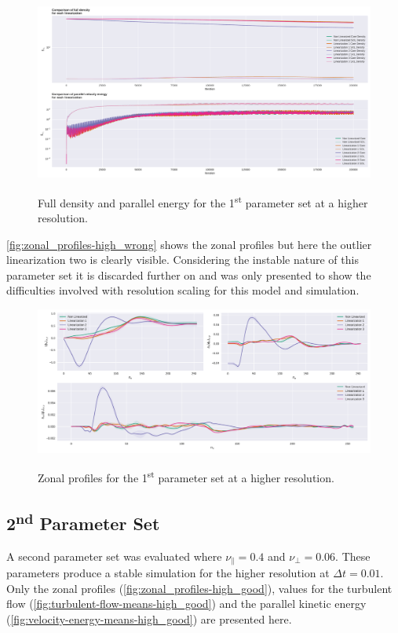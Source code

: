 \documentclass[master.tex]{subfiles}
\begin{document}
\begin{figure}[!hbtp]
    \includegraphics[width=\linewidth]{pdfs/0-11_0-001375/density_vs_velocity.pdf}
    \label{fig:density-velocity-high-wrong}
    \caption{Full density and parallel energy for the 1\textsuperscript{st} parameter set at a higher resolution.}
\end{figure}

\autoref{fig:zonal_profiles-high_wrong} shows the zonal profiles but here the outlier linearization two is clearly visible. Considering the instable nature of this parameter set it is discarded further on and was only presented to show the difficulties involved with resolution scaling for this model and simulation.

\begin{figure}[!hbtp]
    \includegraphics[width=\linewidth]{pdfs/0-11_0-001375/zonal_profiles.pdf}
    \label{fig:zonal_profiles-high_wrong}
    \caption{Zonal profiles for the 1\textsuperscript{st} parameter set at a higher resolution.}
\end{figure}

\subsection{2\textsuperscript{nd} Parameter Set}
A second parameter set was evaluated where $\nu_\parallel = 0.4$ and $\nu_\perp = 0.06$. These parameters produce a stable simulation for the higher resolution at $\Delta t = 0.01$. Only the zonal profiles (\autoref{fig:zonal_profiles-high_good}), values for the turbulent flow (\autoref{fig:turbulent-flow-means-high_good}) and the parallel kinetic energy (\autoref{fig:velocity-energy-means-high_good}) are presented here. 
\end{document}
